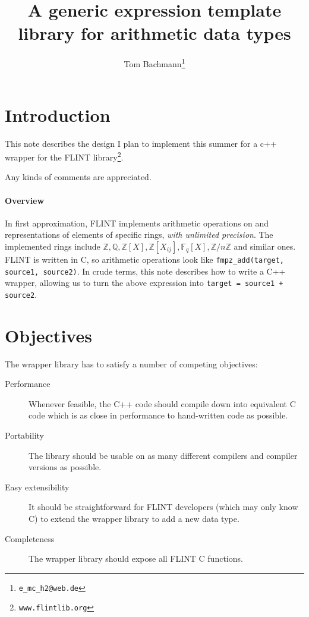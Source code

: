 \documentclass{scrartcl}
\title{A generic expression template library for arithmetic data types}
\author{Tom Bachmann\footnote{\texttt{e\_mc\_h2@web.de}}}
\begin{document}
\maketitle

\section*{Introduction}

This note describes the design I plan to implement this summer for a c++
wrapper for the FLINT library\footnote{\texttt{www.flintlib.org}}.

Any kinds of comments are appreciated.

\paragraph{Overview}
In first approximation, FLINT implements arithmetic operations on and
representations of elements of specific rings, \emph{with unlimited
precision}. The implemented rings include $\mathbb{Z}, \mathbb{Q},
\mathbb{Z}[X], \mathbb{Z}[X_{ij}], \mathbb{F}_q[X], \mathbb{Z}/n\mathbb{Z}$
and similar ones. FLINT is written in C, so arithmetic operations look like
\texttt{fmpz\_add(target, source1, source2)}. In crude terms, this note
describes how to write a C++ wrapper, allowing us to turn the above
expression into \texttt{target = source1 + source2}.


\section*{Objectives}

The wrapper library has to satisfy a number of competing objectives:

\begin{description}
\item[Performance] Whenever feasible, the C++ code should compile down into
    equivalent C code which is as close in performance to hand-written code as
    possible.
\item[Portability] The library should be usable on as many different
    compilers and compiler versions as possible.
\item[Easy extensibility] It should be straightforward for FLINT developers
    (which may only know C) to extend the wrapper library to add a new data
    type.
\item[Completeness] The wrapper library should expose all FLINT C
    functions.
\end{description}
\end{document}
